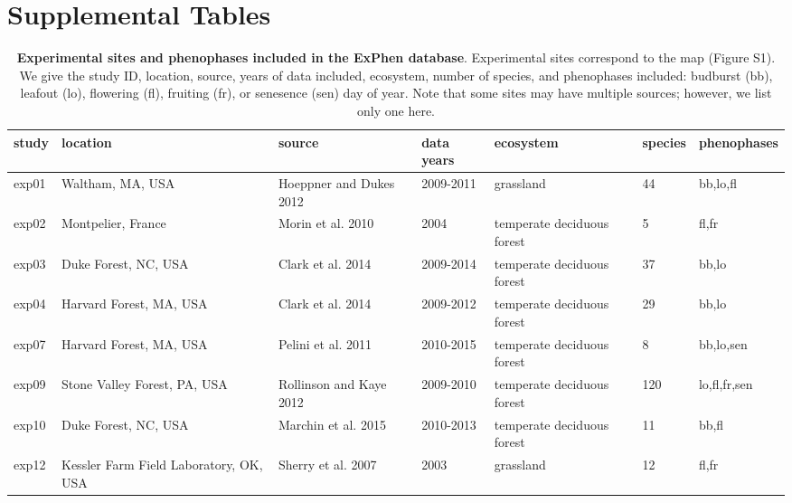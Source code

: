 \documentclass{article}
\begin{document}
\clearpage
\section* {Supplemental Tables}

\begin{table}[ht]
\centering
\caption{\textbf{Experimental sites and phenophases included in the ExPhen database}. Experimental sites correspond to the map (Figure S1). We give the study ID, location, source, years of data included, ecosystem, number of species, and phenophases included: budburst (bb), leafout (lo), flowering (fl), fruiting (fr), or senesence (sen) day of year. Note that some sites may have multiple sources; however, we list only one here.} 
\label{tab:studylocs}
\begingroup\footnotesize
\begin{tabular}{|p{}|p{}|p{}|p{}|p{}|p{}|p{}|}
  \hline
study & location & source & data years & ecosystem & species & phenophases \\ 
  \hline
exp01 & Waltham, MA, USA & Hoeppner and Dukes 2012 & 2009-2011 & grassland & 44 & bb,lo,fl \\ 
   \hline
exp02 & Montpelier, France & Morin et al. 2010 & 2004 & temperate deciduous forest & 5 & fl,fr \\ 
   \hline
exp03 & Duke Forest, NC, USA & Clark et al. 2014 & 2009-2014 & temperate deciduous forest & 37 & bb,lo \\ 
   \hline
exp04 & Harvard Forest, MA, USA & Clark et al. 2014 & 2009-2012 & temperate deciduous forest & 29 & bb,lo \\ 
   \hline
exp07 & Harvard Forest, MA, USA & Pelini et al. 2011 & 2010-2015 & temperate deciduous forest & 8 & bb,lo,sen \\ 
   \hline
exp09 & Stone Valley Forest, PA, USA & Rollinson and Kaye 2012 & 2009-2010 & temperate deciduous forest & 120 & lo,fl,fr,sen \\ 
   \hline
exp10 & Duke Forest, NC, USA & Marchin et al. 2015 & 2010-2013 & temperate deciduous forest & 11 & bb,fl \\ 
   \hline
exp12 & Kessler Farm Field Laboratory, OK, USA & Sherry et al. 2007 & 2003 & grassland & 12 & fl,fr \\ 
   \hline
\end{tabular}
\endgroup
\end{table}%

\clearpage
\end{document}
